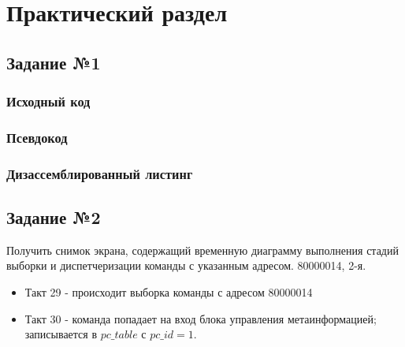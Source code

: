 \chapter{Практический раздел}

    \section{Задание №1}
    
        \subsection{Исходный код}
        
            
\newpage
        
        \subsection{Псевдокод}
        
            
\newpage

        \subsection{Дизассемблированный листинг}


\newpage

    \section{Задание №2}

        Получить снимок экрана, содержащий временную диаграмму выполнения стадий выборки и диспетчеризации команды с указанным адресом. 80000014, 2-я.


        \begin{itemize}
            \item Такт 29 - происходит выборка команды с адресом 80000014
            \item Такт 30 - команда попадает на вход блока управления метаинформацией; записывается в \(pc\_table\) с \(pc\_id = 1\).
        \end{itemize}

